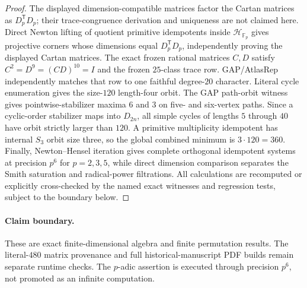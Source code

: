 \begin{proof}
The displayed dimension-compatible matrices factor the Cartan matrices as
$D_p^{\mathsf T}D_p$; their trace-congruence derivation and uniqueness are not
claimed here. Direct Newton lifting of quotient primitive idempotents inside
$\mathcal H_{\mathbb F_p}$ gives projective corners whose dimensions equal
$D_p^{\mathsf T}D_p$, independently proving the displayed Cartan matrices.
The exact frozen rational matrices $C,D$ satisfy
$C^2=D^9=(CD)^{10}=I$ and the frozen $25$-class trace row. GAP/AtlasRep
independently matches that row to one faithful degree-$20$ character. Literal
cycle enumeration gives the size-$120$
length-four orbit. The GAP path-orbit witness gives pointwise-stabilizer maxima
$6$ and $3$ on five- and six-vertex paths. Since a cyclic-order stabilizer
maps into $D_{2n}$, all simple cycles of lengths $5$ through $40$ have orbit
strictly larger than $120$. A primitive multiplicity idempotent has internal
$S_3$ orbit size three, so the global combined minimum is $3\cdot120=360$.
Finally, Newton--Hensel iteration gives complete orthogonal idempotent systems
at precision $p^6$ for $p=2,3,5$, while direct dimension comparison separates
the Smith saturation and radical-power filtrations.  All calculations are
recomputed or explicitly cross-checked by the named exact witnesses and
regression tests, subject to the boundary below.
\end{proof}

\paragraph{Claim boundary.}
These are exact finite-dimensional algebra and finite permutation results.
The literal-$480$ matrix provenance and full historical-manuscript PDF builds
remain separate runtime checks. The $p$-adic assertion is executed through
precision $p^6$, not promoted as an infinite computation.
